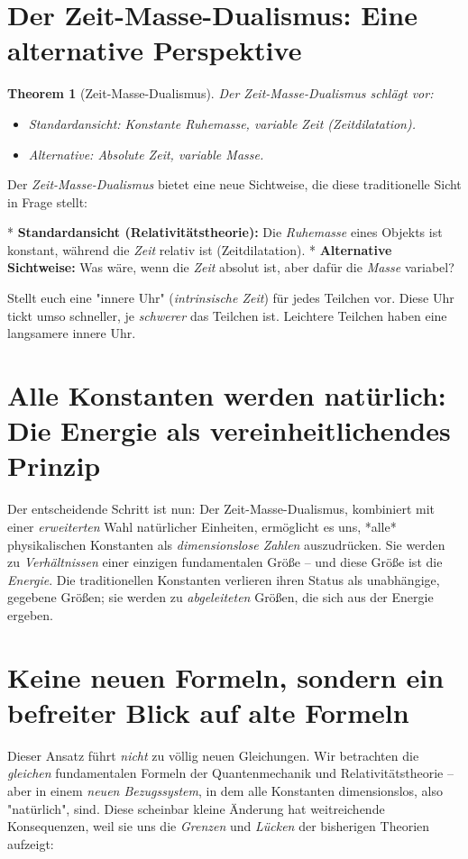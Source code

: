 \documentclass[a4paper,12pt]{article}
\newtheorem{theorem}{Theorem}[section]
\begin{document}
	\section{Der Zeit-Masse-Dualismus: Eine alternative Perspektive}
	\begin{theorem}[Zeit-Masse-Dualismus]
		Der Zeit-Masse-Dualismus schlägt vor:
		\begin{itemize}
			\item Standardansicht: Konstante Ruhemasse, variable Zeit (Zeitdilatation).
			\item Alternative: Absolute Zeit, variable Masse.
		\end{itemize}
	\end{theorem}
	Der \emph{Zeit-Masse-Dualismus} bietet eine neue Sichtweise, die diese traditionelle Sicht in Frage stellt:
	
	*   \textbf{Standardansicht (Relativitätstheorie):} Die \emph{Ruhemasse} eines Objekts ist konstant, während die \emph{Zeit} relativ ist (Zeitdilatation).
	*   \textbf{Alternative Sichtweise:} Was wäre, wenn die \emph{Zeit} absolut ist, aber dafür die \emph{Masse} variabel?
	
	Stellt euch eine "innere Uhr" (\emph{intrinsische Zeit}) für jedes Teilchen vor. Diese Uhr tickt umso schneller, je \emph{schwerer} das Teilchen ist. Leichtere Teilchen haben eine langsamere innere Uhr.
	
	\section{Alle Konstanten werden natürlich: Die Energie als vereinheitlichendes Prinzip}
	Der entscheidende Schritt ist nun: Der Zeit-Masse-Dualismus, kombiniert mit einer \emph{erweiterten} Wahl natürlicher Einheiten, ermöglicht es uns, *alle* physikalischen Konstanten als \emph{dimensionslose Zahlen} auszudrücken. Sie werden zu \emph{Verhältnissen} einer einzigen fundamentalen Größe – und diese Größe ist die \emph{Energie}. Die traditionellen Konstanten verlieren ihren Status als unabhängige, gegebene Größen; sie werden zu \emph{abgeleiteten} Größen, die sich aus der Energie ergeben.
	
	\section{Keine neuen Formeln, sondern ein befreiter Blick auf alte Formeln}
	Dieser Ansatz führt \emph{nicht} zu völlig neuen Gleichungen. Wir betrachten die \emph{gleichen} fundamentalen Formeln der Quantenmechanik und Relativitätstheorie – aber in einem \emph{neuen Bezugssystem}, in dem alle Konstanten dimensionslos, also "natürlich", sind. Diese scheinbar kleine Änderung hat weitreichende Konsequenzen, weil sie uns die \emph{Grenzen} und \emph{Lücken} der bisherigen Theorien aufzeigt:
	
\end{document}
